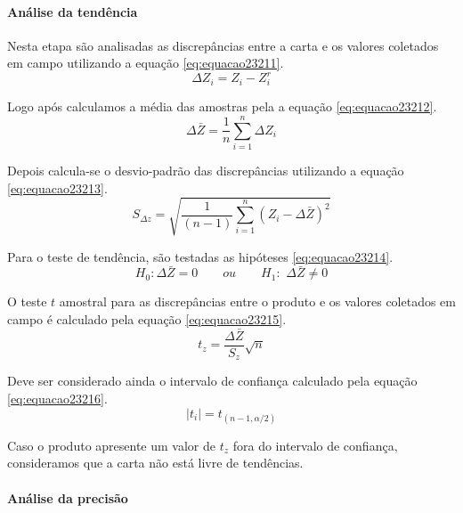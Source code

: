 \documentclass[12pt,a4paper]{article}
\begin{document}
		\paragraph{Análise da tendência}
		Nesta etapa são analisadas as discrepâncias entre a carta e os valores coletados em campo utilizando a equação \ref{eq:equacao23211}.
		\begin{equation}
		\Delta Z_{i}=Z_{i}-Z_{i}^{r}
		\label{eq:equacao23211}
		\end{equation}
		
		Logo após calculamos a média das amostras pela a equação \ref{eq:equacao23212}.
		\begin{equation}
		\Delta \bar{Z}={\frac{1}{n}}\sum_{i=1}^{n} \Delta Z_{i}
		\label{eq:equacao23212}
		\end{equation}
		
		Depois calcula-se o desvio-padrão das discrepâncias utilizando a equação \ref{eq:equacao23213}.
		\begin{equation}
		S_{\Delta z}=\sqrt{{\frac{1}{(n-1)}} \sum_{i=1}^{n}(Z_{i}-\Delta\bar{Z})^2}
		\label{eq:equacao23213}
		\end{equation}
		
		Para o teste de tendência, são testadas as hipóteses \ref{eq:equacao23214}.
		\begin{equation}
		H_{0}: \Delta \bar{Z}=0\quad\quad ou\quad\quad
		H_{1}:\,\, \Delta \bar{Z}\neq 0
		\label{eq:equacao23214}
		\end{equation}
		
		O teste $t$ amostral para as discrepâncias entre o produto e os valores coletados
		em campo é calculado pela equação \ref{eq:equacao23215}.
		\begin{equation}
		t_{z}=\frac{\Delta\bar{Z}}{S_{z}}\sqrt{n}
		\label{eq:equacao23215}
		\end{equation}
		
		Deve ser considerado ainda o intervalo de confiança calculado pela equação \ref{eq:equacao23216}.
		\begin{equation}                   
		\left | t_{i} \right |=t_{(n-1,\alpha /2)}
		\label{eq:equacao23216}
		\end{equation}

		Caso o produto apresente um valor de $t_{z}$ fora do intervalo de confiança,
		consideramos que a carta não está livre de tendências.
		
		\paragraph{Análise da precisão}
		
\end{document}
